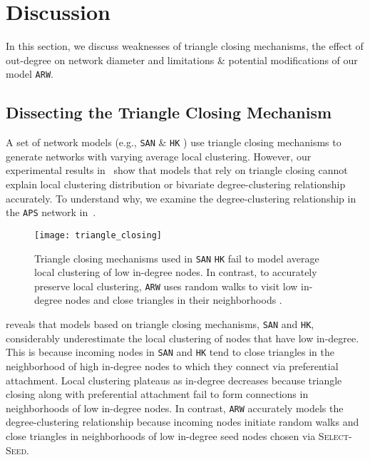 
\section{Discussion}
\label{sec:Discussion}
In this section, we discuss weaknesses of triangle closing mechanisms,
the effect of out-degree on network diameter and limitations \& potential
modifications of our model \texttt{ARW}.

\subsection{Dissecting the Triangle Closing Mechanism}
\label{ss:tc}

A set of network models (e.g., \texttt{SAN} \cite{gong2012evolution} \& \texttt{HK} \cite{holme2002growing})
use triangle closing mechanisms to generate networks with
varying average local clustering. However, our experimental results
in~ show that models that rely on triangle closing
cannot explain local clustering distribution or bivariate degree-clustering
relationship accurately. To understand why, we examine the degree-clustering
relationship in the \texttt{APS} network in~.
\begin{figure}[b]
    \centering
    \texttt{[image: triangle\_closing]}
    \caption{Triangle closing mechanisms used in \texttt{SAN} \texttt{HK} fail to
    model average local clustering of low in-degree nodes. In contrast,
    to accurately preserve local clustering, \texttt{ARW} uses {random walks} to visit
    low in-degree nodes and close triangles in their neighborhoods .}
    \label{fig:triangle_closing}
\end{figure}

 reveals that models based on triangle closing mechanisms,
\texttt{SAN} and \texttt{HK}, considerably underestimate the local clustering of
nodes that have low in-degree. This is because incoming nodes in \texttt{SAN} and \texttt{HK}
tend to close triangles in the neighborhood of high in-degree nodes to which they
connect via preferential attachment. Local clustering plateaus as in-degree decreases because
triangle closing along with preferential attachment fail to form connections in neighborhoods
of low in-degree nodes. In contrast, \texttt{ARW} accurately models the degree-clustering relationship
because incoming nodes initiate random walks and close triangles in neighborhoods of low in-degree
seed nodes chosen via \textsc{Select-Seed}.


